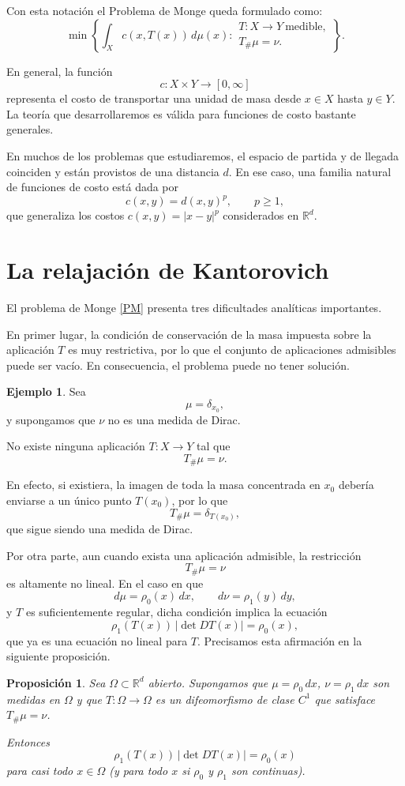 \documentclass[12pt, a4paper]{amsbook}
\newcommand{\R}{{\mathbb R}}
\newtheorem{prop}[teo]{Proposición}
\theoremstyle{remark}
\theoremstyle{definition}
\newtheorem{ejem}[teo]{Ejemplo}
\numberwithin{section}{chapter}
\numberwithin{subsection}{section}
\numberwithin{equation}{section}
\numberwithin{figure}{chapter}
\begin{document}
Con esta notación el Problema de Monge queda formulado como:
\begin{equation}\tag{PM}\label{PM}
\min\left\{
\int_X c(x,T(x))\,d\mu(x)
:
\begin{array}{l}
T\colon X\to Y\ \text{medible},\\
T_\#\mu=\nu.
\end{array}
\right\}.
\end{equation}

En general, la función
\[
c\colon X\times Y\to[0,\infty]
\]
representa el costo de transportar una unidad de masa desde \(x\in X\) hasta \(y\in Y\). La teoría que desarrollaremos es válida para funciones de costo bastante generales.

En muchos de los problemas que estudiaremos, el espacio de partida y de llegada coinciden y están provistos de una distancia \(d\). En ese caso, una familia natural de funciones de costo está dada por
\[
c(x,y)=d(x,y)^p,
\qquad p\ge1,
\]
que generaliza los costos $c(x,y)=|x-y|^p$ considerados en $\R^d$.

\section{La relajación de Kantorovich}\label{sec.kantorovich}

El problema de Monge \eqref{PM} presenta tres dificultades analíticas importantes.

En primer lugar, la condición de conservación de la masa impuesta sobre la aplicación \(T\) es muy restrictiva, por lo que el conjunto de aplicaciones admisibles puede ser vacío. En consecuencia, el problema puede no tener solución.

\begin{ejem}
Sea
\[
\mu=\delta_{x_0},
\]
y supongamos que \(\nu\) no es una medida de Dirac.

No existe ninguna aplicación \(T\colon X\to Y\) tal que
\[
T_\#\mu=\nu.
\]

En efecto, si existiera, la imagen de toda la masa concentrada en \(x_0\) debería enviarse a un único punto \(T(x_0)\), por lo que
\[
T_\#\mu=\delta_{T(x_0)},
\]
que sigue siendo una medida de Dirac.
\end{ejem}

Por otra parte, aun cuando exista una aplicación admisible, la restricción
\[
T_\#\mu=\nu
\]
es altamente no lineal. En el caso en que
\[
d\mu=\rho_0(x)\,dx,
\qquad
d\nu=\rho_1(y)\,dy,
\]
y \(T\) es suficientemente regular, dicha condición implica la ecuación
\[
\rho_1(T(x))\,|\det DT(x)|
=
\rho_0(x),
\]
que ya es una ecuación no lineal para \(T\). Precisamos esta afirmación
en la siguiente proposición.
\begin{prop}\label{prop.cambio.variables}
Sea $\Omega\subset\R^d$ abierto. Supongamos que $\mu=\rho_0\,dx$,
$\nu=\rho_1\,dx$ son medidas en $\Omega$ y que
$T:\Omega\to\Omega$ es un difeomorfismo de clase $C^1$ que satisface
$T_{\#}\mu=\nu$.

Entonces
\[
\rho_1(T(x))\,|\det DT(x)|
=
\rho_0(x)
\]
para casi todo $x\in\Omega$ (y para todo $x$ si $\rho_0$ y $\rho_1$ son continuas).
\end{prop}
\end{document}
